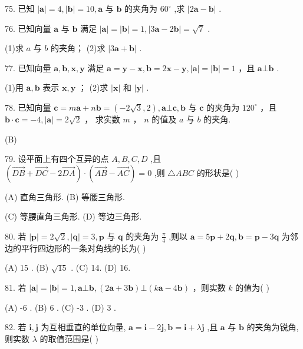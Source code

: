 \documentclass[10pt]{article}
\begin{document}
75. 已知 \(\left| \mathbf{a}\right|  = 4,\left| \mathbf{b}\right|  = {10},\mathbf{a}\) 与 \(\mathbf{b}\) 的夹角为 \({60}^{ \circ  }\) ,求 \(\left| {2\mathbf{a} - \mathbf{b}}\right|\) .

76. 已知向量 \(\mathbf{a}\) 与 \(\mathbf{b}\) 满足 \(\left| \mathbf{a}\right|  = \left| \mathbf{b}\right|  = 1,\left| {3\mathbf{a} - 2\mathbf{b}}\right|  = \sqrt{7}\) .

(1)求 \(a\) 与 \(b\) 的夹角； (2)求 \(\left| {3\mathbf{a} + \mathbf{b}}\right|\) .

77. 已知向量 \(\mathbf{a},\mathbf{b},\mathbf{x},\mathbf{y}\) 满足 \(\mathbf{a} = \mathbf{y} - \mathbf{x},\mathbf{b} = 2\mathbf{x} - \mathbf{y},\left| \mathbf{a}\right|  = \left| \mathbf{b}\right|  = 1\) ，且 \(\mathbf{a}\bot \mathbf{b}\) .

(1)用 \(\mathbf{a},\mathbf{b}\) 表示 \(\mathbf{x},\mathbf{y}\) ； (2)求 \(\left| \mathbf{x}\right|\) 和 \(\left| \mathbf{y}\right|\) .

78. 已知向量 \(\mathbf{c} = m\mathbf{a} + n\mathbf{b} = \left( {-2\sqrt{3},2}\right) ,\mathbf{a} \bot  \mathbf{c},\mathbf{b}\) 与 \(\mathbf{c}\) 的夹角为 \({120}^{ \circ  }\) ，且 \(\mathbf{b} \cdot  \mathbf{c} =  - 4,\left| \mathbf{a}\right|  = 2\sqrt{2}\) ， 求实数 \(m\) ， \(n\) 的值及 \(a\) 与 \(b\) 的夹角.

(B)

79. 设平面上有四个互异的点 \(A,B,C,D\) ,且 \(\left( {\overrightarrow{DB} + \overrightarrow{DC} - 2\overrightarrow{DA}}\right)  \cdot  \left( {\overrightarrow{AB} - \overrightarrow{AC}}\right)  = 0\) ,则 \(\bigtriangleup {ABC}\) 的形状是( )

(A) 直角三角形. (B) 等腰三角形.

(C) 等腰直角三角形. (D) 等边三角形.

80. 若 \(\left| \mathbf{p}\right|  = 2\sqrt{2},\left| \mathbf{q}\right|  = 3,\mathbf{p}\) 与 \(\mathbf{q}\) 的夹角为 \(\frac{\pi }{4}\) ,则以 \(\mathbf{a} = 5\mathbf{p} + 2\mathbf{q},\mathbf{b} = \mathbf{p} - 3\mathbf{q}\) 为邻边的平行四边形的一条对角线的长为( )

(A) 15 . (B) \(\sqrt{15}\) . (C) 14. (D) 16.

81. 若 \(\left| \mathbf{a}\right|  = \left| \mathbf{b}\right|  = 1,\mathbf{a} \bot  \mathbf{b},\left( {{2\mathbf{a}} + {3\mathbf{b}}}\right)  \bot  \left( {{k\mathbf{a}} - {4\mathbf{b}}}\right)\) ，则实数 \(k\) 的值为( )

(A) -6 . (B) 6 . (C) -3 . (D) 3 .

82. 若 \(\mathbf{i},\mathbf{j}\) 为互相垂直的单位向量, \(\mathbf{a} = \mathbf{i} - 2\mathbf{j},\mathbf{b} = \mathbf{i} + \lambda \mathbf{j}\) ,且 \(\mathbf{a}\) 与 \(\mathbf{b}\) 的夹角为锐角,则实数 \(\lambda\) 的取值范围是( )
\end{document}
